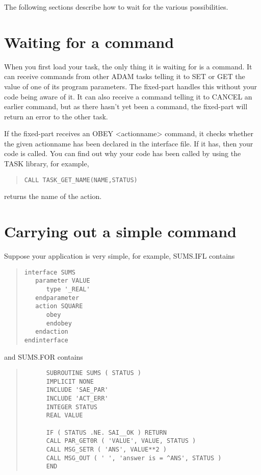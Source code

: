 \documentclass[twoside,11pt]{article}
\newcommand{\xlabel}[1]{}
\renewcommand{\_}{\texttt{\symbol{95}}}
\begin{document}
The following sections describe how to wait for the various
possibilities.

\section{Waiting for a command\xlabel{waiting_for_a_command}}

When you first load your task, the only thing it is waiting for is a
command. It can receive commands from other ADAM tasks telling it to SET
or GET the value of one of its program parameters. The fixed-part
handles this without your code being aware of it. It can also receive a
command telling it to CANCEL an earlier command, but as there hasn't yet
been a command, the fixed-part will return an error to the other task.

If the fixed-part receives an OBEY <action\_name> command, it checks
whether the given action\_name has been declared in the interface file.
If it has, then your code is called. You can find out why your code has
been called by using the TASK library, for example,
\small \begin{quote} \begin{verbatim}
CALL TASK_GET_NAME(NAME,STATUS)
\end{verbatim} \end{quote} \normalsize
returns the name of the action.

\section{Carrying out a simple command\xlabel{carrying_out_a_simple_command}}

Suppose your application is very simple, for example, SUMS.IFL contains

\small \begin{quote} \begin{verbatim}
interface SUMS
   parameter VALUE
      type '_REAL'
   endparameter
   action SQUARE
      obey
      endobey
   endaction
endinterface
\end{verbatim} \end{quote} \normalsize

and SUMS.FOR contains

\small \begin{quote} \begin{verbatim}
      SUBROUTINE SUMS ( STATUS )
      IMPLICIT NONE
      INCLUDE 'SAE_PAR'
      INCLUDE 'ACT_ERR'
      INTEGER STATUS
      REAL VALUE

      IF ( STATUS .NE. SAI__OK ) RETURN
      CALL PAR_GET0R ( 'VALUE', VALUE, STATUS )
      CALL MSG_SETR ( 'ANS', VALUE**2 )
      CALL MSG_OUT ( ' ', 'answer is = ^ANS', STATUS )
      END
\end{verbatim} \end{quote} \normalsize
\end{document}
